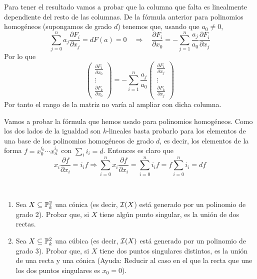 \documentclass[twoside]{article}
\begin{document}
\begin{solucion}
\begin{enumerate}
Para tener el resultado vamos a probar que la columna que falta es linealmente dependiente del resto de las columnas. De la fórmula anterior para polinomios homogéneos (supongamos de grado $d$) tenemos que, usando que $a_0\neq0$,
$$
\sum_{j=0}^n a_j \frac{\partial F_i}{\partial x_j}=dF(a) = 0 \quad \Longrightarrow \quad \frac{\partial F_i}{\partial x_0} = -\sum_{j=1}^n \frac{a_j}{a_0} \frac{\partial F_i}{\partial x_j}
$$
Por lo que
$$
\begin{pmatrix}
 \frac{\partial F_1}{\partial x_0}\\
 \vdots\\
  \frac{\partial F_k}{\partial x_0}
\end{pmatrix} = -\sum_{i=1}^n  \frac{a_j}{a_0} \begin{pmatrix}
 \frac{\partial F_1}{\partial x_j}\\
 \vdots\\
  \frac{\partial F_k}{\partial x_j}
\end{pmatrix}
$$
Por tanto el rango de la matriz no varía al ampliar con dicha columna.
\end{enumerate}
Vamos a probar la fórmula que hemos usado para polinomios homogéneos. Como los dos lados de la igualdad son $k$-lineales basta probarlo para los elementos de una base de los polinomios homogéneos de grado $d$, es decir, los elementos de la forma $f=x_0^{i_0}\cdots x_n^{i_n}$ con $\sum_i i_i = d$. Entonces es claro que
$$
x_i \frac{\partial f}{\partial x_i} = i_i f \Rightarrow \sum_{i=0}^n x_i \frac{\partial f}{\partial x_i} = \sum_{i=0}^n i_i f = f \sum_{i=0}^n i_i  = df
$$
\end{solucion}


\newpage
\begin{ejercicio}{6}\
 
\begin{enumerate}
\item\label{1} Sea $X \subseteq \mathbb{P}^2_k$ una cónica (es decir, $\mathcal{I}(X$) está generado por
un polinomio de grado 2). Probar que, si $X$ tiene algún punto singular,
es la unión de dos rectas.

\item\label{2} Sea $X \subseteq \mathbb{P}^2_k$ una cúbica (es decir, $\mathcal{I}(X)$ está generado por un polinomio
de grado 3). Probar que, si $X$ tiene dos puntos singulares distintos, es la
unión de una recta y una cónica (Ayuda: Reducir al caso en el que la recta
que une los dos puntos singulares es $x_0 = 0$).

\end{enumerate}
\end{ejercicio}
\end{document}
